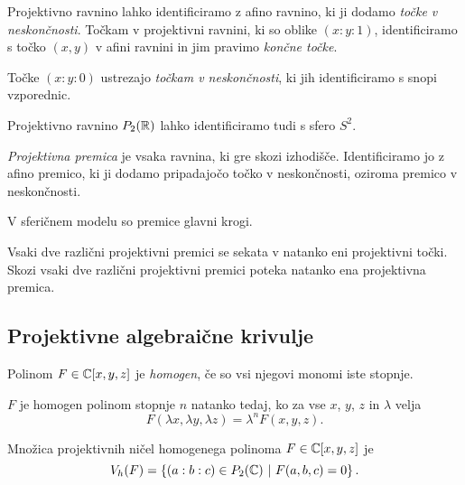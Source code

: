 \begin{opomba}
Projektivno ravnino lahko identificiramo z afino ravnino, ki ji
dodamo \emph{točke v neskončnosti}. Točkam v projektivni ravnini,
ki so oblike $(x : y : 1)$, identificiramo s točko $(x, y)$ v afini
ravnini in jim pravimo \emph{končne točke}.

Točke $(x : y : 0)$ ustrezajo \emph{točkam v neskončnosti}, ki jih
identificiramo s snopi vzporednic.
\end{opomba}

\begin{opomba}
Projektivno ravnino $P_2(\mathbb{R})$ lahko identificiramo tudi s sfero
$S^2$.
\end{opomba}

\begin{definicija}
\emph{Projektivna premica} je
vsaka ravnina, ki gre skozi izhodišče. Identificiramo jo z afino
premico, ki ji dodamo pripadajočo točko v neskončnosti, oziroma
premico v neskončnosti.
\end{definicija}

\begin{opomba}
V sferičnem modelu so premice glavni krogi.
\end{opomba}

\begin{opomba}
Vsaki dve različni projektivni premici se sekata v natanko eni
projektivni točki. Skozi vsaki dve različni projektivni premici
poteka natanko ena projektivna premica.
\end{opomba}

\newpage

\subsection{Projektivne algebraične krivulje}

\begin{definicija}
Polinom $F \in \mathbb{C}[x,y,z]$ je \emph{homogen},
če so vsi njegovi monomi iste stopnje.
\end{definicija}

\begin{opomba}
$F$ je homogen polinom stopnje $n$ natanko tedaj, ko za vse $x$,
$y$, $z$ in $\lambda$ velja
\[
F(\lambda x, \lambda y, \lambda z) = \lambda^n F(x, y, z).
\]
\end{opomba}

\begin{definicija}
Množica projektivnih ničel homogenega polinoma $F \in \mathbb{C}[x, y, z]$
je
\[
V_h(F) = \left\{(a : b : c) \in P_2(\mathbb{C})~\middle\vert~F(a, b, c) = 0\right\}.
\]
\end{definicija}

